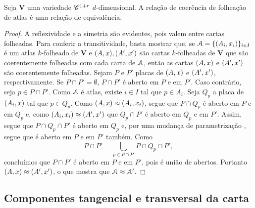 \begin{proposition}
Seja $\bm V$ uma variedade $\mathscr{C}^{1+r}$ $d$-dimensional. A relação de coerência de folheação de atlas é uma relação de equivalência.
\end{proposition}
\begin{proof}
A reflexividade e a simetria são evidentes, pois valem entre cartas folheadas. Para conferir a transitividade, basta mostrar que, se $\mathcal{A} = \{(A_i,x_i)\}_{i \in I}$ é um atlas $k$-folheado de $\bm V$ e $(A,x), (A',x')$ são cartas $k$-folheadas de $\bm V$ que são coerentemente folheadas com cada carta de $\mathcal{A}$, então as cartas $(A,x)$ e $(A',x')$ são coerentemente folheadas. Sejam $P$ e $P'$ placas de $(A,x)$ e $(A',x')$, respectivamente. Se $P \cap P' = \emptyset$, $P \cap P'$ é aberto em $P$ e em $P'$. Caso contrário, seja $p \in P \cap P'$. Como $\mathcal{A}$ é atlas, existe $i \in I$ tal que $p \in A_i$. Seja $Q_p$ a placa de $(A_i,x)$ tal que $p \in Q_p$. Como $(A,x) \approx (A_i,x_i)$, segue que $P \cap Q_p$ é aberto em $P$ e em $Q_p$ e, como $(A_i,x_i) \approx (A',x')$ que $Q_p \cap P'$ é aberto em $Q_p$ e em $P'$. Assim, segue que $P \cap Q_p \cap P'$ é aberto em $Q_p$ e, por uma mudança de parametrização%
, segue que é aberto em $P$ e em $P'$ também. Como
	\begin{equation*}
	P \cap P' = \bigcup_{p \in P \cap P'} P \cap Q_p \cap P',
	\end{equation*}
concluímos que $P \cap P'$ é aberto em $P$ e em $P'$, pois é união de abertos. Portanto $(A,x) \approx (A',x')$, o que mostra que $\mathcal{A} \approx \mathcal{A}'$.
\end{proof}

\subsection{Componentes tangencial e transversal da carta}

